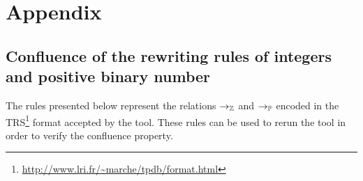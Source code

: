 \chapter{Appendix}

\section{Confluence of the rewriting rules of integers and positive binary number}
\label{app:confluence-int-pos}

The rules presented below represent the relations $\rightarrow_\mathbb{Z}$ and $\rightarrow_\mathbb{P}$ encoded in the TRS\footnote{\url{http://www.lri.fr/~marche/tpdb/format.html}} format accepted by the \cite{CSI} tool.
These rules can be used to rerun the tool in order to verify the confluence property.


